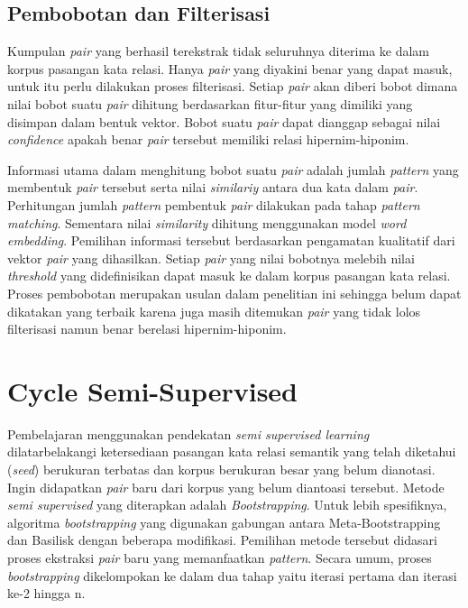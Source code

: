\subsection{Pembobotan dan Filterisasi}
Kumpulan \textit{pair} yang berhasil terekstrak tidak seluruhnya diterima ke dalam korpus pasangan kata relasi. Hanya \textit{pair} yang diyakini benar yang dapat masuk, untuk itu perlu dilakukan proses filterisasi. Setiap \textit{pair} akan diberi bobot dimana nilai bobot suatu \textit{pair} dihitung berdasarkan fitur-fitur yang dimiliki yang disimpan dalam bentuk vektor. Bobot suatu \textit{pair} dapat dianggap sebagai nilai \textit{confidence} apakah benar \textit{pair} tersebut memiliki relasi hipernim-hiponim. 

Informasi utama dalam menghitung bobot suatu \textit{pair} adalah jumlah \textit{pattern} yang membentuk \textit{pair} tersebut serta nilai \textit{similariy} antara dua kata dalam \textit{pair}. Perhitungan jumlah \textit{pattern} pembentuk \textit{pair} dilakukan pada tahap \textit{pattern matching}. Sementara nilai \textit{similarity} dihitung menggunakan model \textit{word embedding}. Pemilihan informasi tersebut berdasarkan pengamatan kualitatif dari vektor \textit{pair} yang dihasilkan. Setiap \textit{pair} yang nilai bobotnya melebih nilai \textit{threshold} yang didefinisikan dapat masuk ke dalam korpus pasangan kata relasi. Proses pembobotan merupakan usulan dalam penelitian ini sehingga belum dapat dikatakan yang terbaik karena juga masih ditemukan \textit{pair} yang tidak lolos filterisasi namun benar berelasi hipernim-hiponim.


\section{Cycle Semi-Supervised}
Pembelajaran menggunakan pendekatan \textit{semi supervised learning} dilatarbelakangi ketersediaan pasangan kata relasi semantik yang telah diketahui (\textit{seed}) berukuran terbatas dan korpus berukuran besar yang belum dianotasi. Ingin didapatkan \textit{pair} baru dari korpus yang belum diantoasi tersebut. Metode \textit{semi supervised} yang diterapkan adalah \textit{Bootstrapping}. Untuk lebih spesifiknya, algoritma \textit{bootstrapping} yang digunakan gabungan antara Meta-Bootstrapping dan Basilisk dengan beberapa modifikasi. Pemilihan metode tersebut didasari proses ekstraksi \textit{pair} baru yang memanfaatkan \textit{pattern}. Secara umum, proses \textit{bootstrapping} dikelompokan ke dalam dua tahap yaitu iterasi pertama dan iterasi ke-2 hingga n.

